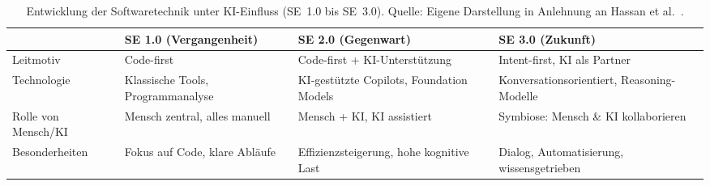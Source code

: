 \begin{table}[H]
    \centering
    \vspace{1em}
    \footnotesize
    \begin{tabular}{|p{3cm}|p{3.3cm}|p{3.3cm}|p{3.3cm}|}
        \hline
                                                 & \textbf{SE 1.0 (Vergangenheit)} & \textbf{SE 2.0 (Gegenwart)} & \textbf{SE 3.0 (Zukunft)} \\
        \hline
        Leitmotiv                                &
        Code-first                               &
        Code-first + KI-Unterstützung            &
        Intent-first, KI als Partner                                                                                                         \\
        \hline
        Technologie                              &
        Klassische Tools, Programmanalyse        &
        KI-gestützte Copilots, Foundation Models &
        Konversationsorientiert, Reasoning-Modelle                                                                                           \\
        \hline
        Rolle von Mensch/KI                      &
        Mensch zentral, alles manuell            &
        Mensch + KI, KI assistiert               &
        Symbiose: Mensch \& KI kollaborieren                                                                                                 \\
        \hline
        Besonderheiten                           &
        Fokus auf Code, klare Abläufe            &
        Effizienzsteigerung, hohe kognitive Last &
        Dialog, Automatisierung, wissensgetrieben                                                                                            \\
        \hline
    \end{tabular}
    \caption{Entwicklung der Softwaretechnik unter KI-Einfluss (SE~1.0 bis SE~3.0). Quelle: Eigene Darstellung in Anlehnung an Hassan et al.~\cite{hassan_towards_2024}.}
    \label{tab:se-evolution}
\end{table}

